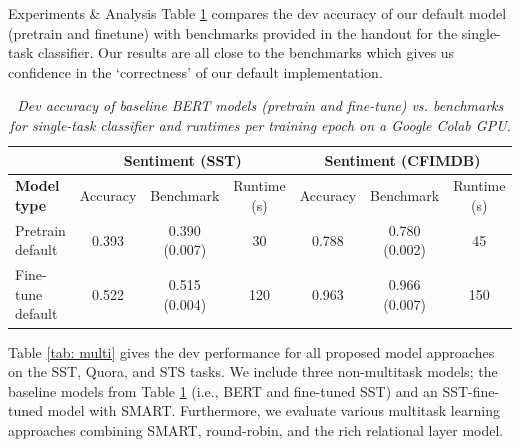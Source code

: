 \documentclass[final]{beamer}
\newlength{\colwidth}
\begin{document}
\begin{frame}[t]
\begin{columns}[t]
\begin{column}{\colwidth}
\begin{block}{Experiments \& Analysis}
Table \ref{tab: single} compares the dev accuracy of our default model (pretrain and finetune) with benchmarks provided in the handout for the single-task classifier. Our results are all close to the benchmarks which gives us confidence in the `correctness' of our default implementation. 
\begin{table}[h]
\footnotesize
\centering
\caption{\textit{Dev accuracy of baseline BERT models (pretrain and fine-tune) vs. benchmarks for single-task classifier and runtimes per training epoch on a Google Colab GPU.}}
\begin{tabular}{|l|ccc|ccc|}
\hline
  & \multicolumn{3}{c|}{\textbf{Sentiment (SST)}} & \multicolumn{3}{c|}{\textbf{Sentiment (CFIMDB)}} \\ \hline
\textbf{Model type}       & Accuracy       & Benchmark & Runtime (s)          & Accuracy        & Benchmark & Runtime (s)           \\ \hline
Pretrain default & 0.393           & 0.390 (0.007) & 30    & 0.788            & 0.780 (0.002)  & 45     \\
Fine-tune default & 0.522           & 0.515 (0.004) & 120    & 0.963            & 0.966 (0.007) & 150      \\ \hline
\end{tabular}
\label{tab: single}
\end{table}

Table \ref{tab: multi} gives the dev performance for all proposed model approaches on the SST, Quora, and STS tasks. We include three non-multitask models; the baseline models from Table \ref{tab: single} (i.e., BERT and fine-tuned SST) and an SST-fine-tuned model with SMART. Furthermore, we evaluate various multitask learning approaches combining SMART, round-robin, and the rich relational layer model.  



\end{block}
\end{column}
\end{columns}
\end{frame}
\end{document}
